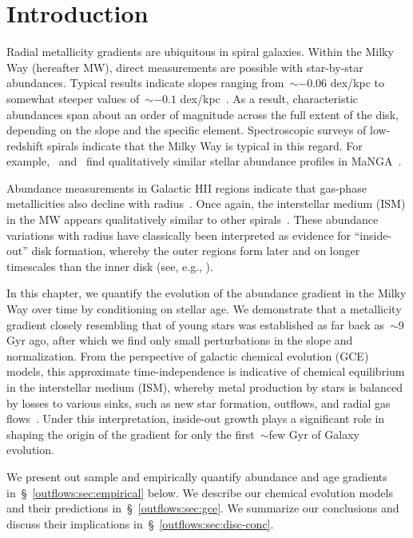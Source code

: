 \section{Introduction}
\label{outflows:sec:intro}
Radial metallicity gradients are ubiquitous in spiral galaxies.
Within the Milky Way (hereafter MW), direct measurements are possible with
star-by-star abundances.
Typical results indicate slopes ranging from~$\sim$$-0.06$ dex/kpc to somewhat
steeper values of~$\sim$$-0.1$ dex/kpc~\citep[e.g.,][]{Nordstroem2004,
Cheng2012, Frinchaboy2013, Hayden2014, Weinberg2019, Myers2022}.
As a result, characteristic abundances span about an order of magnitude across
the full extent of the disk, depending on the slope and the specific element.
Spectroscopic surveys of low-redshift spirals indicate that the Milky Way is
typical in this regard.
For example,~\citet{Goddard2017} and~\citet{Parikh2021} find qualitatively
similar stellar abundance profiles in MaNGA~\citep{Bundy2015}.
\par
Abundance measurements in Galactic HII regions indicate that gas-phase
metallicities also decline with radius~\citep[e.g.,][]{Simpson1995,
Afflerbach1997, Esteban2022, MendezDelgado2022, MendezDelgado2023}.
Once again, the interstellar medium (ISM) in the MW appears qualitatively
similar to other spirals~\citep[e.g.,][]{Belfiore2017, Berg2020,
Franchetto2021, Lutz2021, Boardman2022}.
These abundance variations with radius have classically been interpreted as
evidence for ``inside-out'' disk formation, whereby the outer regions form
later and on longer timescales than the inner disk (see, e.g.,
\citealt{Kauffmann1996}).
\par
In this chapter, we quantify the evolution of the abundance gradient in the
Milky Way over time by conditioning on stellar age.
We demonstrate that a metallicity gradient closely resembling that of young
stars was established as far back as~$\sim$9 Gyr ago, after which we find only
small perturbations in the slope and normalization.
From the perspective of galactic chemical evolution (GCE) models, this
approximate time-independence is indicative of chemical equilibrium in the
interstellar medium (ISM), whereby metal production by stars is balanced by
losses to various sinks, such as new star formation, outflows, and radial gas
flows~\citep{Larson1974, Weinberg2017b}.
Under this interpretation, inside-out growth plays a significant role in
shaping the origin of the gradient for only the first~$\sim$few Gyr of Galaxy
evolution.
\par
We present out sample and empirically quantify abundance and age gradients
in~\S~\ref{outflows:sec:empirical} below.
We describe our chemical evolution models and their predictions
in~\S~\ref{outflows:sec:gce}.
We summarize our conclusions and discuss their implications
in~\S~\ref{outflows:sec:disc-conc}.

